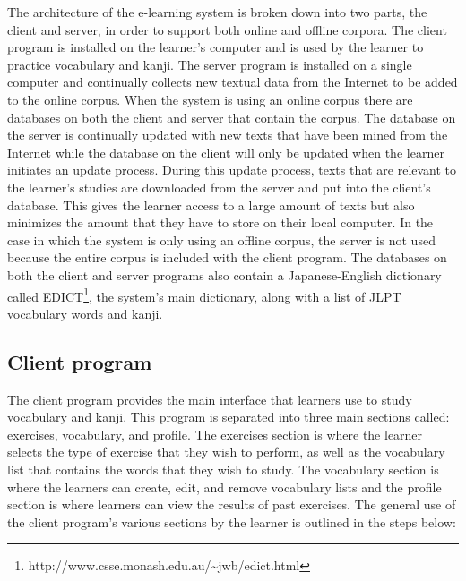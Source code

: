 \documentclass[english]{jnlp_1.4}
\begin{document}
The architecture of the e-learning system is broken down into two parts, the client and server, in order to support both online and offline corpora. The client program is installed on the learner's computer and is used by the learner to practice vocabulary and kanji. The server program is installed on a single computer and continually collects new textual data from the Internet to be added to the online corpus. When the system is using an online corpus there are databases on both the client and server that contain the corpus. The database on the server is continually updated with new texts that have been mined from the Internet while the database on the client will only be updated when the learner initiates an update process. During this update process, texts that are relevant to the learner's studies are downloaded from the server and put into the client's database. This gives the learner access to a large amount of texts but also minimizes the amount that they have to store on their local computer. In the case in which the system is only using an offline corpus, the server is not used because the entire corpus is included with the client program. The databases on both the client and server programs also contain a Japanese-English dictionary called EDICT\footnote{http://www.csse.monash.edu.au/{\textasciitilde}jwb/edict.html}, the system's main dictionary, along with a list of JLPT vocabulary words and kanji.

\subsection{Client program}

The client program provides the main interface that learners use to study vocabulary and kanji. This program is separated into three main sections called: exercises, vocabulary, and profile. The exercises section is where the learner selects the type of exercise that they wish to perform, as well as the vocabulary list that contains the words that they wish to study. The vocabulary section is where the learners can create, edit, and remove vocabulary lists and the profile section is where learners can view the results of past exercises. The general use of the client program's various sections by the learner is outlined in the steps below:
\end{document}
